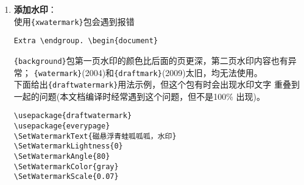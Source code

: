 \documentclass{article}
\begin{document}
\begin{multicols}{2}
\begin{enumerate}
        \item \textbf{添加水印}：\\
              使用\verb|{xwatermark}|包会遇到报错
              \begin{lstlisting}
Extra \endgroup. \begin{document}
\end{lstlisting}
              \verb|{background}|包第一页水印的颜色比后面的页更深，第二页水印内容也有异常；
              \verb|{watermark}|(2004)和\verb|{draftmark}|(2009)太旧，均无法使用。\\
              下面给出\verb|{draftwatermark}|用法示例，但这个包有时会出现水印文字
              重叠到一起的问题(本文档编译时经常遇到这个问题，但不是100\% 出现)。
              \begin{lstlisting}
\usepackage{draftwatermark}
\usepackage{everypage}
\SetWatermarkText{磁悬浮青蛙呱呱呱，水印}
\SetWatermarkLightness{0}
\SetWatermarkAngle{80}
\SetWatermarkColor{gray}
\SetWatermarkScale{0.07}
\end{lstlisting}


\end{enumerate}
\end{multicols}
\end{document}
